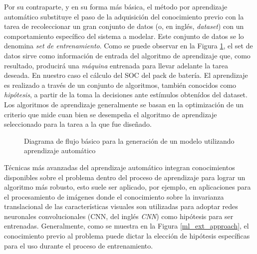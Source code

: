 \noindent Por su contraparte, y en su forma m\'as b\'asica, el m\'etodo por
aprendizaje autom\'atico substituye el paso de la adquisici\'on del conocimiento
previo con la tarea de recoleccionar un gran conjunto de datos (o, en ingl\'es,
\emph{dataset}) con un comportamiento espec\'ifico del sistema a modelar. Este
conjunto de datos se lo denomina \emph{set de entrenamiento}. Como se puede
observar en la Figura \ref{ml_approach}, el set de datos sirve como información
de entrada del algoritmo de aprendizaje que, como resultado, producirá una
\emph{m\'aquina} entrenada para llevar adelante la tarea deseada. En nuestro
caso el cálculo del \acrshort{SOC} del pack de batería. El aprendizaje es
realizado a trav\'es de un conjunto de algoritmos, tambi\'en conocidos como
\emph{hip\'otesis}, a partir de la toma la decisiones ante estímulos obtenídos
del dataset. Los algoritmos de aprendizaje generalmente se basan en la
optimizaci\'on de un criterio que mide cuan bien se desempeña el algoritmo de
aprendizaje seleccionado para la tarea a la que fue diseñado.

\begin{figure}[h!]
    \begin{center}
    \end{center}
    \caption{Diagrama de flujo b\'asico para la generaci\'on de un modelo
    utilizando aprendizaje autom\'atico}
    \label{ml_approach}
\end{figure}

T\'ecnicas m\'as avanzadas del aprendizaje autom\'atico integran conocimientos
disponibles sobre el problema dentro del proceso de aprendizaje para lograr un
algoritmo m\'as robusto, esto suele ser aplicado, por ejemplo, en aplicaciones
para el procesamiento de im\'agenes donde el conocimiento sobre la invarianza
translacional de las caracter\'isticas visuales son utilizadas para adoptar
redes neuronales convolucionales (\acrshort{CNN}, del ingl\'es 
\emph{\acrlong{CNN}}) como hip\'otesis para ser entrenadas. Generalmente, como
se muestra en la Figura \ref{ml_ext_approach}, el conocimiento previo al
problema puede dictar la elecci\'on de hip\'otesis espec\'ificas para el uso
durante el proceso de entrenamiento. 

